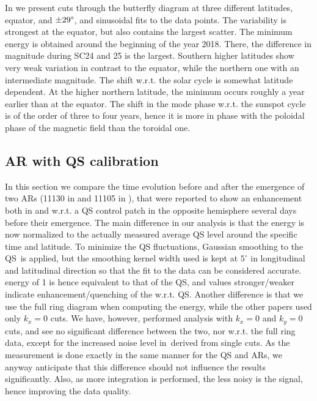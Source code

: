 \documentclass{aa}
\begin{document}
In  we present cuts through the butterfly
diagram at three different latitudes, equator, and $\pm 29\degree$, and sinusoidal fits to the data points. The variability is strongest at the equator, but also contains the largest scatter. The minimum \fff energy 
is obtained
around the beginning of the year 2018. There, the difference in magnitude during SC24 and 25 is the largest. Southern higher latitudes show very weak variation in contrast to the equator, 
while the northern one with an intermediate magnitude. 
The shift w.r.t. the solar cycle is somewhat latitude dependent. At the higher northern latitude, the \fff minimum occurs roughly a year earlier than at the equator. The shift in the \fff mode phase w.r.t. the sunspot cycle is of the order of three to four years, hence it is more in phase with the 
poloidal phase of the magnetic field than the toroidal one.

\subsection{AR \fff with QS calibration}\label{arf}

In this section we compare the \fff time evolution before and after the emergence of 
two ARs (11130 in  and 11105 in ), that were reported to show an enhancement both in \cite{SRB16} and \cite{Waidele22} w.r.t. a QS control patch
in the opposite hemisphere several days before their emergence. The main difference in our analysis
is that the \fff energy is now normalized to the actually measured average QS level
around the specific time and latitude. To minimize
the QS fluctuations, Gaussian smoothing to the QS \ef\,is applied, 
but the smoothing kernel width used is kept at 
$5^\circ$ in longitudinal and latitudinal direction
so that the fit to the data can be considered accurate.
\fff energy of 1 is hence
equivalent to that of the QS, and values stronger/weaker 
indicate enhancement/quenching of the \fff w.r.t. QS.
Another difference is that we use the
full ring diagram when computing the \fff energy, while the
other papers used only $k_x=0$ cuts. We have, however, performed
analysis with $k_x=0$ and $k_y=0$ cuts, and see no significant
difference between the two, nor w.r.t. the full ring data, except for the
increased noise level in \ef\,derived from single cuts.
As the measurement is done exactly in the same
manner for the QS and ARs, we anyway anticipate
that this difference should not influence the results significantly. 
Also, as more integration is performed, the less noisy is the 
signal, hence improving the data quality. 
\end{document}
